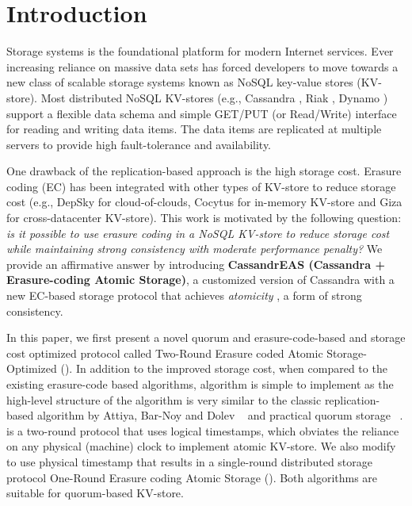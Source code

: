 \section{Introduction}
\label{sec:intro}



Storage systems is the foundational platform for modern Internet services. Ever increasing reliance on massive data sets has forced developers to move towards a new class of scalable storage systems known as NoSQL key-value stores (KV-store). Most distributed NoSQL KV-stores (e.g., Cassandra \cite{Cassandra}, Riak \cite{Riak}, Dynamo \cite{Dynamo}) support a flexible data schema and simple GET/PUT (or Read/Write) interface for reading and writing data items. 
The data items are replicated at multiple servers to provide high fault-tolerance and availability. 

One drawback of the replication-based approach is the high storage cost. Erasure coding (EC) has been integrated with other types of KV-store to reduce storage cost (e.g., DepSky \cite{DepSky13} for cloud-of-clouds, Cocytus \cite{Cocytus2016} for in-memory KV-store  and Giza \cite{GIZA2017} for cross-datacenter KV-store).
This work is motivated by the following question: \textit{is it possible to use erasure coding in a NoSQL KV-store to reduce storage cost while maintaining strong consistency with moderate performance penalty?} We provide an affirmative answer by introducing \textbf{CassandrEAS (Cassandra + Erasure-coding Atomic Storage)}, a customized version of Cassandra \cite{Cassandra} with a new EC-based storage protocol that achieves \textit{atomicity} \cite{lamport}, a form of strong consistency. 

In this paper, we first present a novel quorum and erasure-code-based and storage cost optimized protocol called Two-Round Erasure coded Atomic Storage-Optimized (\treasmod{}). In addition to the improved storage cost, when compared to the existing erasure-code based algorithms, \treasmod{} algorithm is simple to implement as the high-level structure of the algorithm is very similar to the classic replication-based algorithm by Attiya, Bar-Noy and Dolev ~\cite{ABD96} and practical quorum storage ~\cite{Dynamo,pbs-vldb2012}. \treasmod{} is a two-round protocol that uses logical timestamps, which obviates the reliance on  any physical (machine) clock to implement atomic KV-store. We also modify \treasmod{} to use physical timestamp that results in a single-round distributed storage protocol One-Round Erasure coding Atomic Storage (\oreas). Both algorithms are suitable for quorum-based KV-store.%



